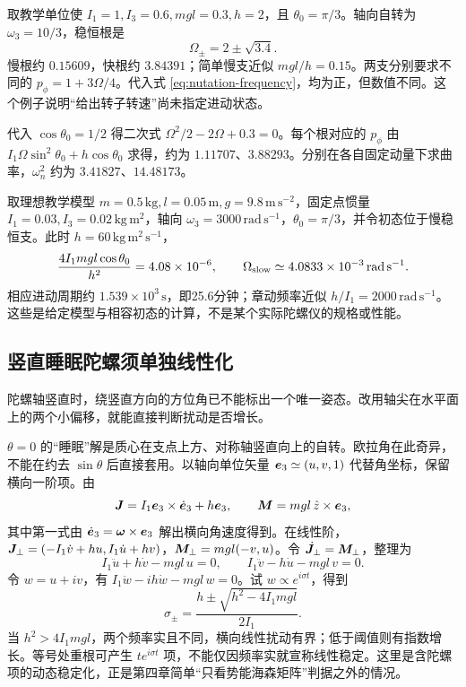 \begin{example}
取教学单位使 $I_1=1,I_3=0.6,mgl=0.3,h=2$，且 $\theta_0=\pi/3$。轴向自转为 $\omega_3=10/3$，稳恒根是
\[
\Omega_\pm=2\pm\sqrt{3.4}.
\]
慢根约 $0.15609$，快根约 $3.84391$；简单慢支近似 $mgl/h=0.15$。两支分别要求不同的 $p_\phi=1+3\Omega/4$。代入式 \eqref{eq:nutation-frequency}，均为正，但数值不同。这个例子说明“给出转子转速”尚未指定进动状态。

代入 $\cos\theta_0=1/2$ 得二次式 $\Omega^2/2-2\Omega+0.3=0$。每个根对应的 $p_\phi$ 由 $I_1\Omega\sin^2\theta_0+h\cos\theta_0$ 求得，约为 $1.11707$、$3.88293$。分别在各自固定动量下求曲率，$\omega_n^2$ 约为 $3.41827$、$14.48173$。
\end{example}

\begin{example}
取理想教学模型 $m=0.5\,\mathrm{kg},l=0.05\,\mathrm m,g=9.8\,\mathrm{m\,s^{-2}}$，固定点惯量 $I_1=0.03,I_3=0.02\,\mathrm{kg\,m^2}$，轴向 $\omega_3=3000\,\mathrm{rad\,s^{-1}}$，$\theta_0=\pi/3$，并令初态位于慢稳恒支。此时 $h=60\,\mathrm{kg\,m^2\,s^{-1}}$，
\[
\frac{4I_1mgl\cos\theta_0}{h^2}=4.08\times10^{-6},\qquad
\Omega_{\rm slow}\simeq4.0833\times10^{-3}\,\mathrm{rad\,s^{-1}}.
\]
相应进动周期约 $1.539\times10^3\,\mathrm s$，即25.6分钟；章动频率近似 $h/I_1=2000\,\mathrm{rad\,s^{-1}}$。这些是给定模型与相容初态的计算，不是某个实际陀螺仪的规格或性能。
\end{example}

\subsection{竖直睡眠陀螺须单独线性化}\label{sec:sleeping-top}
陀螺轴竖直时，绕竖直方向的方位角已不能标出一个唯一姿态。改用轴尖在水平面上的两个小偏移，就能直接判断扰动是否增长。

$\theta=0$ 的“睡眠”解是质心在支点上方、对称轴竖直向上的自转。欧拉角在此奇异，不能在约去 $\sin\theta$ 后直接套用。以轴向单位矢量 $\boldsymbol{e}_3\simeq(u,v,1)$ 代替角坐标，保留横向一阶项。由
\[
\boldsymbol{J}=I_1\boldsymbol{e}_3\times\dot{\boldsymbol{e}}_3+h\boldsymbol{e}_3,\qquad
\boldsymbol{M}=mgl\,\hat z\times\boldsymbol{e}_3,
\]
其中第一式由 $\dot{\boldsymbol{e}}_3=\boldsymbol{\omega}\times\boldsymbol{e}_3$ 解出横向角速度得到。在线性阶，$\boldsymbol{J}_\perp=(-I_1\dot v+hu,I_1\dot u+hv)$，$\boldsymbol{M}_\perp=mgl(-v,u)$。令 $\dot{\boldsymbol{J}}_\perp=\boldsymbol{M}_\perp$，整理为
\[
I_1\ddot u+h\dot v-mgl\,u=0,\qquad
I_1\ddot v-h\dot u-mgl\,v=0.
\]
令 $w=u+iv$，有 $I_1\ddot w-ih\dot w-mgl\,w=0$。试 $w\propto e^{i\sigma t}$，得到
\[
\sigma_\pm=\frac{h\pm\sqrt{h^2-4I_1mgl}}{2I_1}.
\]
当 $h^2>4I_1mgl$，两个频率实且不同，横向线性扰动有界；低于阈值则有指数增长。等号处重根可产生 $t e^{i\sigma t}$ 项，不能仅因频率实就宣称线性稳定。这里是含陀螺项的动态稳定化，正是第四章简单“只看势能海森矩阵”判据之外的情况。

